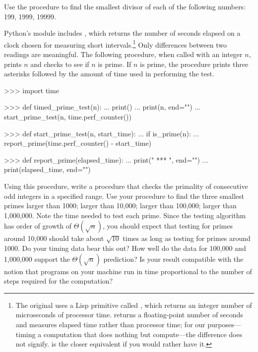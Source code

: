 \begin{exerciseGroup}
\label{Exercise 1.21}
 Use the 
procedure to find the smallest divisor of each of the following numbers: 199,
1999, 19999.

\label{Exercise 1.22}
 Python's  module
includes , which returns the number of seconds elapsed on a
clock chosen for measuring short intervals.\footnote{The original uses a Lisp
primitive called , which returns an integer number of
microseconds of processor time.   returns a
floating-point number of seconds and measures elapsed time rather than
processor time; for our purposes---timing a computation that does nothing but
compute---the difference does not signify.   is the
closer equivalent if you would rather have it.} Only differences between two
readings are meaningful.  The following  procedure,
when called with an integer \( n \), prints \( n \) and checks to see if
\( n \) is prime.  If \( n \) is prime, the procedure prints three asterisks
followed by the amount of time used in performing the test.

\begin{codeBlock}
>>> import time

>>> def timed_prime_test(n):
...     print()
...     print(n, end="")
...     start_prime_test(n, time.perf_counter())

>>> def start_prime_test(n, start_time):
...     if is_prime(n):
...         report_prime(time.perf_counter() - start_time)

>>> def report_prime(elapsed_time):
...     print(" *** ", end="")
...     print(elapsed_time, end="")
\end{codeBlock}

Using this procedure, write a procedure  that checks
the primality of consecutive odd integers in a specified range.  Use your
procedure to find the three smallest primes larger than 1000; larger than
10,000; larger than 100,000; larger than 1,000,000.  Note the time needed to
test each prime.  Since the testing algorithm has order of growth of
\( \Theta(\sqrt{n}) \), you should expect that testing for primes
around 10,000 should take about \( \sqrt{10} \) times as long as testing for
primes around 1000.  Do your timing data bear this out?  How well do the data
for 100,000 and 1,000,000 support the \( \Theta(\sqrt{n}) \) prediction?  Is your
result compatible with the notion that programs on your machine run in time
proportional to the number of steps required for the computation?


\end{exerciseGroup}
